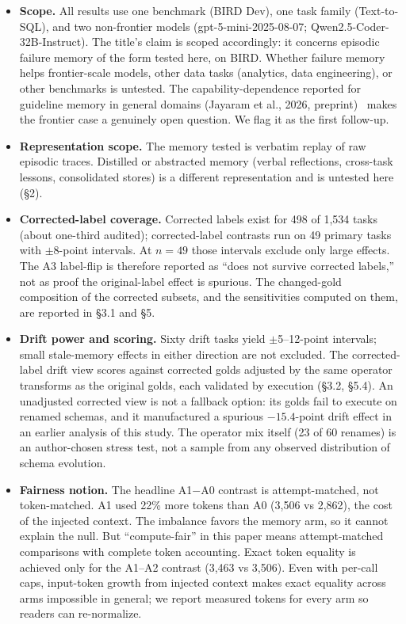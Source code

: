 \documentclass[sigconf, nonacm]{acmart}
\begin{document}
\begin{itemize}
\item \textbf{Scope.} All results use one benchmark (BIRD Dev), one task family (Text-to-SQL), and two non-frontier models (gpt-5-mini-2025-08-07; Qwen2.5-Coder-32B-Instruct). The title's claim is scoped accordingly: it concerns episodic failure memory of the form tested here, on BIRD. Whether failure memory helps frontier-scale models, other data tasks (analytics, data engineering), or other benchmarks is untested. The capability-dependence reported for guideline memory in general domains (Jayaram et al., 2026, preprint)~\cite{jayaram} makes the frontier case a genuinely open question. We flag it as the first follow-up.
\item \textbf{Representation scope.} The memory tested is verbatim replay of raw episodic traces. Distilled or abstracted memory (verbal reflections, cross-task lessons, consolidated stores) is a different representation and is untested here (\S2).
\item \textbf{Corrected-label coverage.} Corrected labels exist for 498 of 1,534 tasks (about one-third audited); corrected-label contrasts run on 49 primary tasks with $\pm$8-point intervals. At $n = 49$ those intervals exclude only large effects. The A3 label-flip is therefore reported as ``does not survive corrected labels,'' not as proof the original-label effect is spurious. The changed-gold composition of the corrected subsets, and the sensitivities computed on them, are reported in \S3.1 and \S5.
\item \textbf{Drift power and scoring.} Sixty drift tasks yield $\pm$5--12-point intervals; small stale-memory effects in either direction are not excluded. The corrected-label drift view scores against corrected golds adjusted by the same operator transforms as the original golds, each validated by execution (\S3.2, \S5.4). An unadjusted corrected view is not a fallback option: its golds fail to execute on renamed schemas, and it manufactured a spurious $-15.4$-point drift effect in an earlier analysis of this study. The operator mix itself (23 of 60 renames) is an author-chosen stress test, not a sample from any observed distribution of schema evolution.
\item \textbf{Fairness notion.} The headline A1$-$A0 contrast is attempt-matched, not token-matched. A1 used 22\% more tokens than A0 (3,506 vs 2,862), the cost of the injected context. The imbalance favors the memory arm, so it cannot explain the null. But ``compute-fair'' in this paper means attempt-matched comparisons with complete token accounting. Exact token equality is achieved only for the A1--A2 contrast (3,463 vs 3,506). Even with per-call caps, input-token growth from injected context makes exact equality across arms impossible in general; we report measured tokens for every arm so readers can re-normalize.

\end{itemize}
\end{document}
